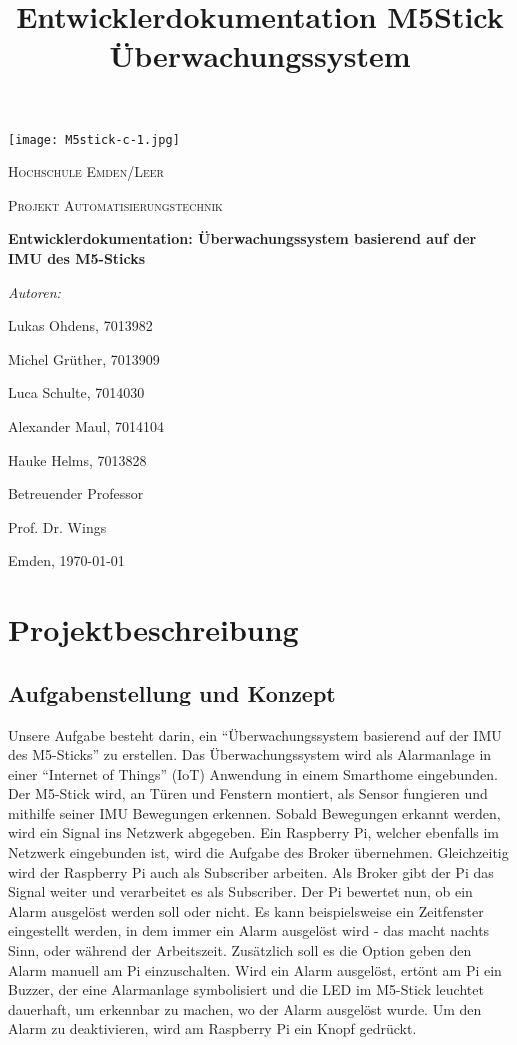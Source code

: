 \documentclass[a4paper,12pt]{article}
\title{Entwicklerdokumentation M5Stick Überwachungssystem}
\begin{document}
\begin{titlepage}
	\centering
	\texttt{[image: M5stick-c-1.jpg]}\par\vspace{1cm}
	{\scshape\LARGE Hochschule Emden/Leer \par}
	\vspace{1cm}
	{\scshape\Large Projekt Automatisierungstechnik\par}
	\vspace{1.5cm}
	{\huge\bfseries Entwicklerdokumentation: Überwachungssystem basierend
	auf der IMU des
	M5-Sticks\par}
	\vspace{2cm}
	{\Large\itshape Autoren:\par {Lukas Ohdens, 7013982\par
	Michel Grüther, 7013909\par Luca Schulte, 7014030\par Alexander
	Maul, 7014104\par Hauke Helms, 7013828}\par}
	\vfill
	Betreuender Professor\par
	Prof. Dr. Wings

	\vfill

	{\large Emden, \today\par}
\end{titlepage}

\tableofcontents
\newpage

\section{Projektbeschreibung}
\subsection{Aufgabenstellung und Konzept}
Unsere Aufgabe besteht darin, ein “Überwachungssystem basierend auf der IMU des M5-Sticks” zu erstellen. Das Überwachungssystem wird als Alarmanlage in einer “Internet of Things” (IoT) Anwendung in einem Smarthome eingebunden. Der M5-Stick wird, an Türen und Fenstern montiert, als Sensor fungieren und mithilfe seiner IMU Bewegungen erkennen. Sobald Bewegungen erkannt werden, wird ein Signal ins Netzwerk abgegeben. Ein Raspberry Pi, welcher ebenfalls im Netzwerk eingebunden ist, wird die Aufgabe des Broker übernehmen. Gleichzeitig wird der Raspberry Pi auch als Subscriber arbeiten. Als Broker gibt der Pi das Signal weiter und verarbeitet es als Subscriber. Der Pi bewertet nun, ob ein Alarm ausgelöst werden soll oder nicht. Es kann beispielsweise ein Zeitfenster eingestellt werden, in dem immer ein Alarm ausgelöst wird - das macht nachts Sinn, oder während der Arbeitszeit. Zusätzlich soll es die Option geben den Alarm manuell am Pi einzuschalten. Wird ein Alarm ausgelöst, ertönt am Pi ein Buzzer, der eine Alarmanlage symbolisiert und die LED im M5-Stick leuchtet dauerhaft, um erkennbar zu machen, wo der Alarm ausgelöst wurde. Um den Alarm zu deaktivieren, wird am Raspberry Pi ein Knopf gedrückt.
\end{document}
